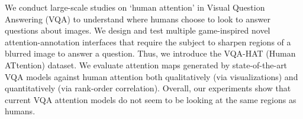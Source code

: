 We conduct large-scale studies on `human attention' in Visual Question Answering (VQA) to understand where humans choose to look to answer questions about images. We design and test multiple game-inspired novel attention-annotation interfaces that require the subject to sharpen regions of a blurred image to answer a question. Thus, we introduce the VQA-HAT (Human ATtention) dataset. We evaluate attention maps generated by state-of-the-art VQA models against human attention both qualitatively (via visualizations) and quantitatively (via rank-order correlation). Overall, our experiments show that current VQA attention models do not seem to be looking at the same regions as humans.
